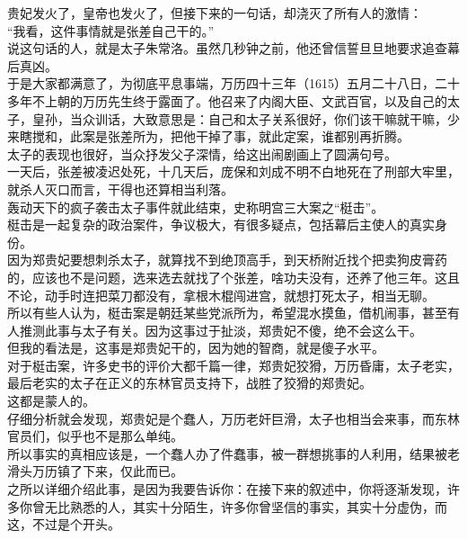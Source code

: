 \begin{multicols}{\theparacolNo}
贵妃发火了，皇帝也发火了，但接下来的一句话，却浇灭了所有人的激情：\\

“我看，这件事情就是张差自己干的。”\\

说这句话的人，就是太子朱常洛。虽然几秒钟之前，他还曾信誓旦旦地要求追查幕后真凶。\\

于是大家都满意了，为彻底平息事端，万历四十三年（1615）五月二十八日，二十多年不上朝的万历先生终于露面了。他召来了内阁大臣、文武百官，以及自己的太子，皇孙，当众训话，大致意思是：自己和太子关系很好，你们该干嘛就干嘛，少来瞎搅和，此案是张差所为，把他干掉了事，就此定案，谁都别再折腾。\\

太子的表现也很好，当众抒发父子深情，给这出闹剧画上了圆满句号。\\

一天后，张差被凌迟处死，十几天后，庞保和刘成不明不白地死在了刑部大牢里，就杀人灭口而言，干得也还算相当利落。\\

轰动天下的疯子袭击太子事件就此结束，史称明宫三大案之“梃击”。\\

梃击是一起复杂的政治案件，争议极大，有很多疑点，包括幕后主使人的真实身份。\\

因为郑贵妃要想刺杀太子，就算找不到绝顶高手，到天桥附近找个把卖狗皮膏药的，应该也不是问题，选来选去就找了个张差，啥功夫没有，还养了他三年。这且不论，动手时连把菜刀都没有，拿根木棍闯进宫，就想打死太子，相当无聊。\\

所以有些人认为，梃击案是朝廷某些党派所为，希望混水摸鱼，借机闹事，甚至有人推测此事与太子有关。因为这事过于扯淡，郑贵妃不傻，绝不会这么干。\\

但我的看法是，这事是郑贵妃干的，因为她的智商，就是傻子水平。\\

对于梃击案，许多史书的评价大都千篇一律，郑贵妃狡猾，万历昏庸，太子老实，最后老实的太子在正义的东林官员支持下，战胜了狡猾的郑贵妃。\\

这都是蒙人的。\\

仔细分析就会发现，郑贵妃是个蠢人，万历老奸巨滑，太子也相当会来事，而东林官员们，似乎也不是那么单纯。\\

所以事实的真相应该是，一个蠢人办了件蠢事，被一群想挑事的人利用，结果被老滑头万历镇了下来，仅此而已。\\

之所以详细介绍此事，是因为我要告诉你：在接下来的叙述中，你将逐渐发现，许多你曾无比熟悉的人，其实十分陌生，许多你曾坚信的事实，其实十分虚伪，而这，不过是个开头。\\

\ifnum{}
	\end{multicols}
\fi
\newpage
